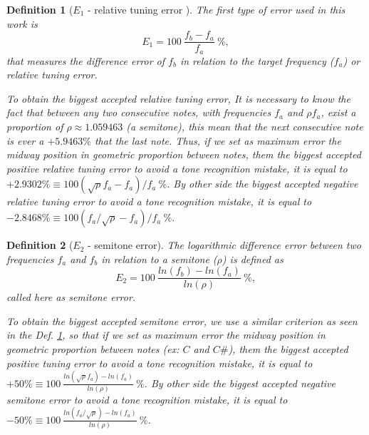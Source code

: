 \documentclass[11pt,twocolumn]{article}
\newtheorem{mydef}{Definition}[section]
\begin{document}
\begin{mydef}[$E_1$ - relative tuning error ]
\label{def:max:E1}
The first type of error used in this work is 
\begin{equation}
E_1=100~\frac{f_b-f_a}{f_a}~\%,
\end{equation} 
that measures the difference error of $f_b$ in relation to the target frequency ($f_a$) or relative tuning error.


To obtain the biggest accepted relative tuning error,
It is necessary to know the fact that between any two consecutive notes, with frequencies
$f_a$ and $\rho f_a$, exist a proportion of $\rho\approx 1.059463$ (a semitone), this mean
that the next consecutive note is ever a $+5.9463\%$ that the last note. Thus, 
if we set as maximum error the midway position in geometric proportion between notes, them 
the biggest accepted positive relative tuning error 
to avoid a tone recognition mistake, it is equal to $+2.9302\% \equiv 100 (\sqrt{\rho}f_a-f_a)/f_a~\%$.
By other side 
the biggest accepted negative relative tuning error 
to avoid a tone recognition mistake, it is equal to $-2.8468\% \equiv 100 (f_a/\sqrt{\rho}-f_a)/f_a~\%$.

\end{mydef}

\begin{mydef}[$E_2$ - semitone error]
\label{def:max:E2}
The logarithmic difference error between two frequencies $f_a$ and $f_b$ in relation to a semitone ($\rho$) is
defined as
\begin{equation}
E_2=100~\frac{ln(f_b)-ln(f_a)}{ln(\rho)}~\%, 
\end{equation}
called here as semitone error.


To obtain the biggest accepted semitone error,
we use a similar criterion as seen in the Def. \ref{def:max:E1},
so that 
if we set as maximum error the midway position in geometric proportion between notes (ex: $C$ and $C\#$), them 
the biggest accepted positive tuning error 
to avoid a tone recognition mistake, it is equal to $+50\% \equiv 100~\frac{ln(\sqrt{\rho} f_a)-ln(f_a)}{ln(\rho)}~\%  $.
By other side 
the biggest accepted negative semitone error 
to avoid a tone recognition mistake, it is equal to $-50\% \equiv 100~\frac{ln( f_a/\sqrt{\rho})-ln(f_a)}{ln(\rho)}~\%  $.
\end{mydef}
\end{document}
